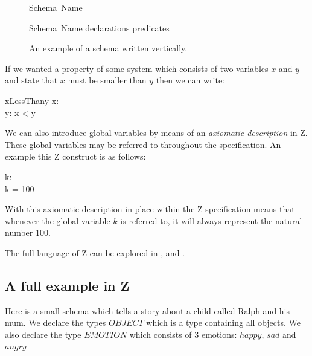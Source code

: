 \begin{figure}[H]
\vspace{-0.2in}
\centering
\begin{minipage}{0.45\textwidth}
\begin{zed}
\noindent Schema\ Name 
\end{zed}
\vspace{-0.18in}
\caption{An example of a schema written horizontally.\label{fig:horizontalschema}}
\vspace{-0.2in}
\end{minipage}\hfill
\begin{minipage}{0.45\textwidth}
\begin{schema}{Schema\ Name}
declarations
\where
predicates
\end{schema}
\vspace{-0.2in}
\caption{An example of a schema written vertically. \label{fig:verticalschema}}
\vspace{-0.2in}
\end{minipage}
\end{figure}

If we wanted a property of some system which consists of two variables $x$ and $y$ and state that $x$ must be smaller than $y$ then we can write:

\begin{schema}{xLessThany}
x: \nat \\
y: \nat
\where
x < y
\end{schema}

We can also introduce global variables by means of an \textit{axiomatic description} in Z. These global variables may be referred to throughout the specification. An example this Z construct is as follows:

\begin{axdef}
k: \nat \\
\where
k = 100
\end{axdef}

With this axiomatic description in place within the Z specification means that whenever the global variable $k$ is referred to, it will always represent the natural number 100.

The full language of Z can be explored in \cite{spiveyreferencemanual}, \cite{essenceofz} and \cite{Woodcock:1996:UZS:235337}.

\subsection{A full example in Z}
Here is a small schema which tells a story about a child called Ralph and his mum. We declare the types $OBJECT$ which is a type containing all objects. We also declare the type $EMOTION$ which consists of 3 emotions: $happy$, $sad$ and $angry$

